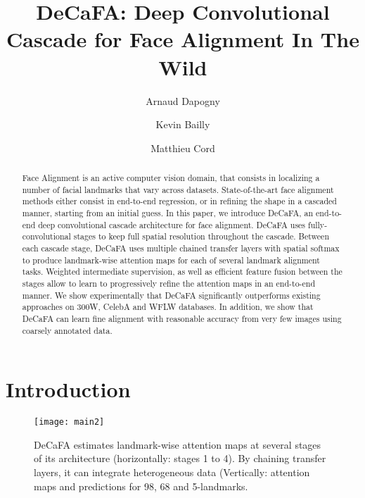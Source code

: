 \documentclass[10pt,twocolumn,letterpaper]{article}
\begin{document}
\title{DeCaFA: Deep Convolutional Cascade for Face Alignment In The Wild}

\author[1, 2]{Arnaud Dapogny}
\author[2, 3]{Kevin Bailly}
\author[1]{Matthieu Cord}


\date{}
\maketitle

\begin{abstract}
	Face Alignment is an active computer vision domain, that consists in localizing a number of facial landmarks that vary across datasets. State-of-the-art face alignment methods either consist in end-to-end regression, or in refining the shape in a cascaded manner, starting from an initial guess. In this paper, we introduce DeCaFA, an end-to-end deep convolutional cascade architecture for face alignment. DeCaFA uses fully-convolutional stages to keep full spatial resolution throughout the cascade. Between each cascade stage, DeCaFA uses multiple chained transfer layers with spatial softmax to produce landmark-wise attention maps for each of several landmark alignment tasks. Weighted intermediate supervision, as well as efficient feature fusion between the stages allow to learn to progressively refine the attention maps in an end-to-end manner. We show experimentally that DeCaFA significantly outperforms existing approaches on 300W, CelebA and WFLW databases. In addition, we show that DeCaFA can learn fine alignment with reasonable accuracy from very few images using coarsely annotated data.
\end{abstract}

\section{Introduction}

\begin{figure}[h!]
	\centering
	\texttt{[image: main2]}
	\caption{DeCaFA estimates landmark-wise attention maps at several stages of its architecture (horizontally: stages 1 to 4). By chaining transfer layers, it can integrate heterogeneous data (Vertically: attention maps and predictions for 98, 68 and 5-landmarks.}
	\label{main}
\end{figure}
\end{document}
